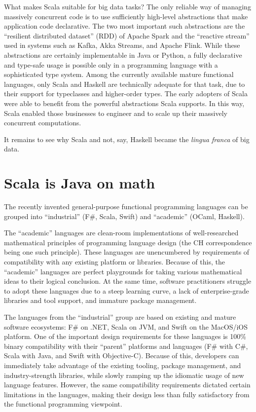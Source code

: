 What makes Scala suitable for big data tasks? The only reliable way
of managing massively concurrent code is to use sufficiently high-level
abstractions that make application code declarative. The two most
important such abstractions are the \textsf{``}resilient distributed dataset\textsf{''}
(RDD) of Apache Spark and the \textsf{``}reactive stream\textsf{''} used in systems
such as Kafka, Akka Streams, and Apache Flink. While these abstractions
are certainly implementable in Java or Python, a fully declarative
and type-safe usage is possible only in a programming language with
a sophisticated type system. Among the currently available mature
functional languages, only Scala and Haskell are technically adequate
for that task, due to their support for typeclasses and higher-order
types. The early adopters of Scala were able to benefit from the powerful
abstractions Scala supports. In this way, Scala enabled those businesses
to engineer and to scale up their massively concurrent computations.

It remains to see why Scala and not, say, Haskell became the \emph{lingua
franca} of big data.

\section{Scala is Java on math }

The recently invented general-purpose functional programming languages
can be grouped into \textsf{``}industrial\textsf{''} (F\#, Scala, Swift) and \textsf{``}academic\textsf{''}
(OCaml, Haskell).

The \textsf{``}academic\textsf{''} languages are clean-room implementations of well-researched
mathematical principles of programming language design (the CH correspondence
being one such principle). These languages are unencumbered by requirements
of compatibility with any existing platform or libraries. Because
of this, the \textsf{``}academic\textsf{''} languages are perfect playgrounds for
taking various mathematical ideas to their logical conclusion. At
the same time, software practitioners struggle to adopt these languages
due to a steep learning curve, a lack of enterprise-grade libraries
and tool support, and immature package management.

The languages from the \textsf{``}industrial\textsf{''} group are based on existing
and mature software ecosystems: F\# on .NET, Scala on JVM, and Swift
on the MacOS/iOS platform. One of the important design requirements
for these languages is 100\% binary compatibility with their \textsf{``}parent\textsf{''}
platforms and languages (F\# with C\#, Scala with Java, and Swift
with Objective-C). Because of this, developers can immediately take
advantage of the existing tooling, package management, and industry-strength
libraries, while slowly ramping up the idiomatic usage of new language
features. However, the same compatibility requirements dictated certain
limitations in the languages, making their design less than fully
satisfactory from the functional programming viewpoint.

